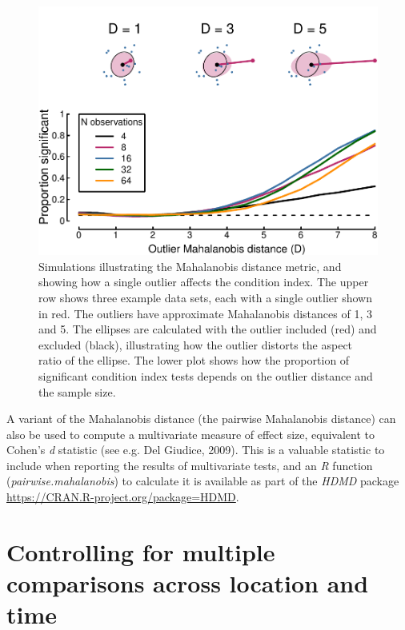 \documentclass[]{article}
\begin{document}
\begin{figure}

{\centering \includegraphics{manuscript_files/figure-latex/outlierplot-1} 

}

\caption{Simulations illustrating the Mahalanobis distance metric, and showing how a single outlier affects the condition index. The upper row shows three example data sets, each with a single outlier shown in red. The outliers have approximate Mahalanobis distances of 1, 3 and 5. The ellipses are calculated with the outlier included (red) and excluded (black), illustrating how the outlier distorts the aspect ratio of the ellipse. The lower plot shows how the proportion of significant condition index tests depends on the outlier distance and the sample size.}\label{fig:outlierplot}
\end{figure}

A variant of the Mahalanobis distance (the pairwise Mahalanobis distance) can also be used to compute a multivariate measure of effect size, equivalent to Cohen's \emph{d} statistic (see e.g. Del Giudice, 2009). This is a valuable statistic to include when reporting the results of multivariate tests, and an \emph{R} function (\emph{pairwise.mahalanobis}) to calculate it is available as part of the \emph{HDMD} package \url{https://CRAN.R-project.org/package=HDMD}.

\hypertarget{controlling-for-multiple-comparisons-across-location-and-time}{%
\section{Controlling for multiple comparisons across location and time}\label{controlling-for-multiple-comparisons-across-location-and-time}}
\end{document}
